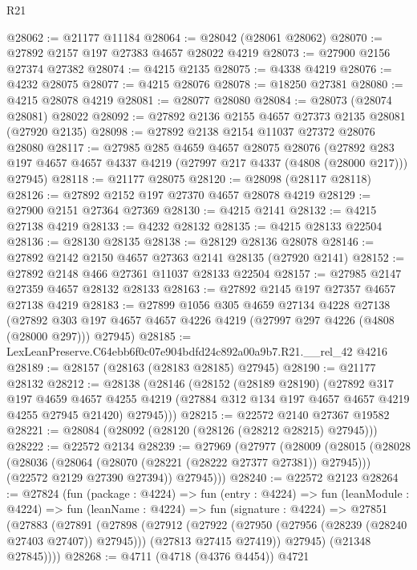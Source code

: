 \begin{lexlean}{R21}
\begin{coremodule}
@28062 := @21177 @11184
@28064 := @28042 (@28061 @28062)
@28070 := @27892 @2157 @197 @27383 @4657 @28022 @4219
@28073 := @27900 @2156 @27374 @27382
@28074 := @4215 @2135
@28075 := @4338 @4219
@28076 := @4232 @28075
@28077 := @4215 @28076
@28078 := @18250 @27381
@28080 := @4215 @28078 @4219
@28081 := @28077 @28080
@28084 := @28073 (@28074 @28081) @28022
@28092 := @27892 @2136 @2155 @4657 @27373 @2135 @28081 (@27920 @2135)
@28098 := @27892 @2138 @2154 @11037 @27372 @28076 @28080
@28117 := @27985
    @285
    @4659
    @4657
    @28075
    @28076
    (@27892 @283 @197 @4657 @4657 @4337 @4219 (@27997 @217 @4337 (@4808 (@28000 @217))) @27945)
@28118 := @21177 @28075
@28120 := @28098 (@28117 @28118)
@28126 := @27892 @2152 @197 @27370 @4657 @28078 @4219
@28129 := @27900 @2151 @27364 @27369
@28130 := @4215 @2141
@28132 := @4215 @27138 @4219
@28133 := @4232 @28132
@28135 := @4215 @28133 @22504
@28136 := @28130 @28135
@28138 := @28129 @28136 @28078
@28146 := @27892 @2142 @2150 @4657 @27363 @2141 @28135 (@27920 @2141)
@28152 := @27892 @2148 @466 @27361 @11037 @28133 @22504
@28157 := @27985 @2147 @27359 @4657 @28132 @28133
@28163 := @27892 @2145 @197 @27357 @4657 @27138 @4219
@28183 := @27899
    @1056
    @305
    @4659
    @27134
    @4228
    @27138
    (@27892 @303 @197 @4657 @4657 @4226 @4219 (@27997 @297 @4226 (@4808 (@28000 @297))) @27945)
@28185 := LexLeanPreserve.C64ebb6f0c07e904bdfd24c892a00a9b7.R21.__rel_42 @4216
@28189 := @28157 (@28163 (@28183 @28185) @27945)
@28190 := @21177 @28132
@28212 := @28138
    (@28146
      (@28152
        (@28189 @28190)
        (@27892
          @317
          @197
          @4659
          @4657
          @4255
          @4219
          (@27884 @312 @134 @197 @4657 @4657 @4219 @4255 @27945 @21420)
          @27945)))
@28215 := @22572 @2140 @27367 @19582
@28221 := @28084 (@28092 (@28120 (@28126 (@28212 @28215) @27945)))
@28222 := @22572 @2134
@28239 := @27969
    (@27977
      (@28009
        (@28015
          (@28028
            (@28036 (@28064 (@28070 (@28221 (@28222 @27377 @27381)) @27945)))
            (@22572 @2129 @27390 @27394))
          @27945)))
@28240 := @22572 @2123
@28264 := @27824
    (fun (package : @4224) =>
    fun (entry : @4224) =>
    fun (leanModule : @4224) =>
    fun (leanName : @4224) =>
    fun (signature : @4224) =>
    @27851
      (@27883
        (@27891
          (@27898
            (@27912
              (@27922 (@27950 (@27956 (@28239 (@28240 @27403 @27407)) @27945)))
              (@27813 @27415 @27419))
            @27945)
          (@21348 @27845))))
@28268 := @4711 (@4718 (@4376 @4454)) @4721

\end{coremodule}
\end{lexlean}
